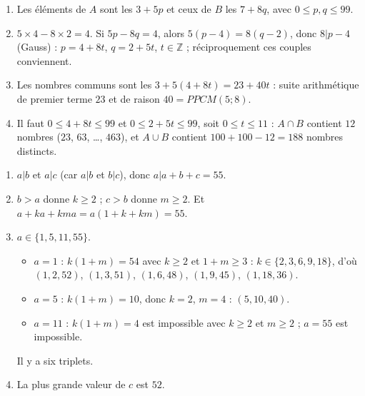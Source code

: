 \begin{corrige}
\begin{sol}
\begin{enumerate}
\end{enumerate}
\end{sol}
%
\begin{sol}
\begin{enumerate}
\item Les \'el\'ements de $A$ sont les $3 + 5p$ et ceux de $B$ les $7 + 8q$, avec $0 \leq p, q \leq 99$.
\item $5 \times 4 - 8 \times 2 = 4$. Si $5p - 8q = 4$, alors $5(p - 4) = 8(q - 2)$, donc $8 | p - 4$ (Gauss) :
      $p = 4 + 8t$, $q = 2 + 5t$, $t \in \mathbb{Z}$ ; r\'eciproquement ces couples conviennent.
\item Les nombres communs sont les $3 + 5(4 + 8t) = 23 + 40t$ : suite arithm\'etique de premier terme $23$ et de raison $40 = PPCM(5;8)$.
\item Il faut $0 \leq 4 + 8t \leq 99$ et $0 \leq 2 + 5t \leq 99$, soit $0 \leq t \leq 11$ : $A \cap B$ contient $12$ nombres
      ($23$, $63$, \ldots, $463$), et $A \cup B$ contient $100 + 100 - 12 = 188$ nombres distincts.
\end{enumerate}
\end{sol}
%
\begin{sol}
\begin{enumerate}
\item $a | b$ et $a | c$ (car $a | b$ et $b | c$), donc $a | a + b + c = 55$.
\item $b > a$ donne $k \geq 2$ ; $c > b$ donne $m \geq 2$. Et $a + ka + kma = a(1 + k + km) = 55$.
\item $a \in \{1, 5, 11, 55\}$.
      \begin{itemize}
      \item $a = 1$ : $k(1 + m) = 54$ avec $k \geq 2$ et $1 + m \geq 3$ : $k \in \{2, 3, 6, 9, 18\}$, d'o\`u
            $(1, 2, 52)$, $(1, 3, 51)$, $(1, 6, 48)$, $(1, 9, 45)$, $(1, 18, 36)$.
      \item $a = 5$ : $k(1+m) = 10$, donc $k = 2$, $m = 4$ : $(5, 10, 40)$.
      \item $a = 11$ : $k(1+m) = 4$ est impossible avec $k \geq 2$ et $m \geq 2$ ; $a = 55$ est impossible.
      \end{itemize}
      Il y a six triplets.
\item La plus grande valeur de $c$ est $52$.
\end{enumerate}
\end{sol}
%
\begin{sol}
\begin{enumerate}

\end{enumerate}
\end{sol}
\end{corrige}
